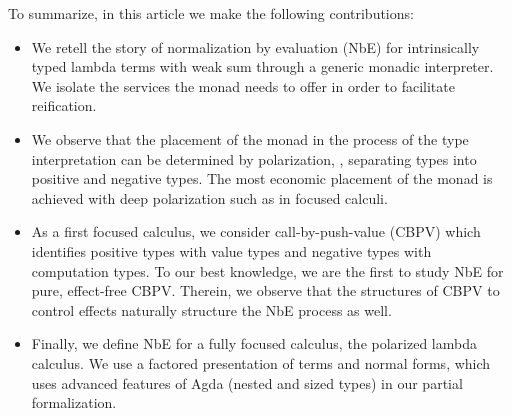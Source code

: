 \documentclass[sigplan,screen,fleqn,review]{acmart} %
\begin{document}
To summarize, in this article we make the following contributions:
\begin{itemize}
\item We retell the story of normalization by evaluation (NbE) for intrinsically
  typed lambda terms with weak sum through a generic monadic
  interpreter.  We isolate the services the monad needs to offer in
  order to facilitate reification.

\item We observe that the placement of the monad in the process of the
  type interpretation can be determined by polarization, \ie,
  separating types into positive and negative types.
  The most economic placement of the monad is achieved with deep
  polarization such as in focused calculi.
\item As a first focused calculus, we consider call-by-push-value
  (CBPV) which identifies positive types with value types and negative
  types with computation types.  To our best knowledge, we are the
  first to study NbE for pure, effect-free CBPV.  Therein, we observe
  that the structures of CBPV to control effects naturally structure
  the NbE process as well.
\item Finally, we define NbE for a fully focused calculus, the
  polarized lambda calculus.
  We use a factored presentation of terms and normal forms,
  which uses advanced features of Agda (nested and sized types)
  in our partial formalization.
\end{itemize}



\end{document}
